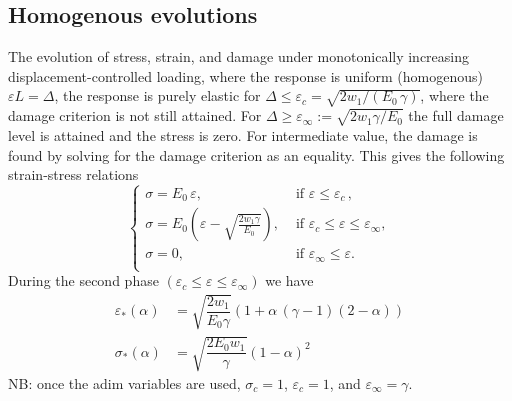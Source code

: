 \documentclass[final,3p,times,authoryear]{elsarticle}
\begin{document}
\subsection{Homogenous evolutions}
%
%
%
%
%
The evolution of stress, strain, and damage under monotonically increasing displacement-controlled loading, where the response is uniform (homogenous) $\varepsilon L=\Delta$, the response is purely elastic for 
$\Delta \leq  \varepsilon_c = \sqrt{2w_1/(E_0 \, \gamma)}$, where the damage criterion is not still attained. For $\Delta \geq  \varepsilon_\infty := \sqrt{2w_1 \gamma / E_0}$ the full damage level is attained and the stress is zero. For intermediate value, the damage is found by solving for the damage criterion as an equality. This gives the following strain-stress relations
\begin{equation}
\label{eq:cases}
\begin{cases}
   \sigma = E_0 \,{\varepsilon}, &\text{ if } {\varepsilon} \leq \varepsilon_c \, , \\
    \sigma = E_0\left({\varepsilon} -\sqrt{\frac{2w_1 \gamma}{E_0 }}\right), 
    &\text{ if } 
   \varepsilon_c    \leq    \varepsilon \leq    \varepsilon_\infty,    \\
    \sigma=0, 
    &\text{ if } 
    \varepsilon_\infty \leq  \varepsilon.\\
\end{cases}
\end{equation}
During the second phase $( \varepsilon_c    \leq    \varepsilon \leq    \varepsilon_\infty)$ we have
\begin{subequations}
\begin{align}
\label{eq:eps_homog}
\varepsilon_*(\alpha)  &= \sqrt{\dfrac{2w_1}{E_0 \gamma}}\left(1+ \alpha \, (\gamma-1)(2-\alpha ) \right) \\
%
\sigma_*(\alpha) &= \sqrt{\dfrac{2E_0 w_1}{\gamma}}(1-\alpha)^2
\end{align}
\end{subequations}
NB: once the adim variables are used, $\sigma_c=1$, $\varepsilon_c=1$, and $\varepsilon_\infty=\gamma$.


\end{document}
